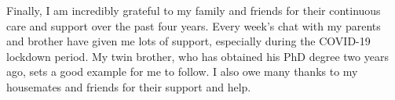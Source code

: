 Finally, I am incredibly grateful to my family and friends for their continuous care and support over the past four years. Every week's chat with my parents and brother have given me lots of support, especially during the COVID-19 lockdown period. My twin brother, who has obtained his PhD degree two years ago, sets a good example for me to follow. I also owe many thanks to my housemates and friends for their support and help.


% 
%

%

\newpage
\pagestyle{fancy}
\bgroup
\hypersetup{linkcolor=black}
\setcounter{tocdepth}{2}
\tableofcontents
\egroup

\newpage
{}
\bgroup
\hypersetup{linkcolor=black}
\listoftables
\egroup

